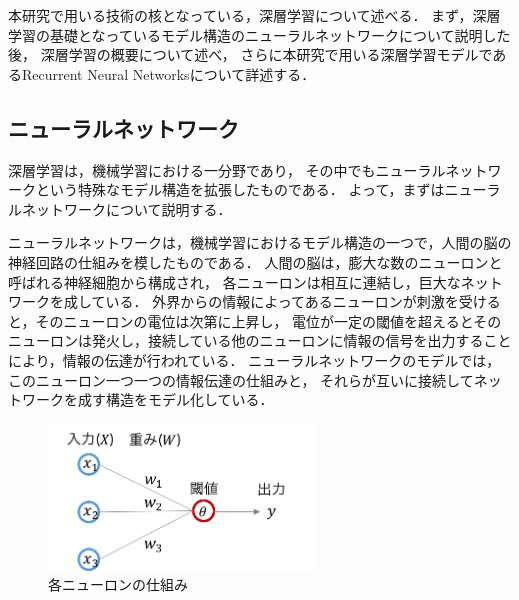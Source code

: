 本研究で用いる技術の核となっている，深層学習について述べる．
まず，深層学習の基礎となっているモデル構造のニューラルネットワークについて説明した後，
深層学習の概要について述べ，
さらに本研究で用いる深層学習モデルであるRecurrent Neural Networksについて詳述する．



\subsection{ニューラルネットワーク}
深層学習は，機械学習における一分野であり，
その中でもニューラルネットワークという特殊なモデル構造を拡張したものである．
よって，まずはニューラルネットワークについて説明する．

ニューラルネットワークは，機械学習におけるモデル構造の一つで，人間の脳の神経回路の仕組みを模したものである．
人間の脳は，膨大な数のニューロンと呼ばれる神経細胞から構成され，
各ニューロンは相互に連結し，巨大なネットワークを成している．
外界からの情報によってあるニューロンが刺激を受けると，そのニューロンの電位は次第に上昇し，
電位が一定の閾値を超えるとそのニューロンは発火し，接続している他のニューロンに情報の信号を出力することにより，情報の伝達が行われている．
ニューラルネットワークのモデルでは，
このニューロン一つ一つの情報伝達の仕組みと，
それらが互いに接続してネットワークを成す構造をモデル化している．

\begin{figure}[htb]
\begin{center}
\includegraphics[width=200pt]{./img/neuron.png}
\end{center}
\caption{各ニューロンの仕組み}
\label{fig:neuron}
\end{figure}

